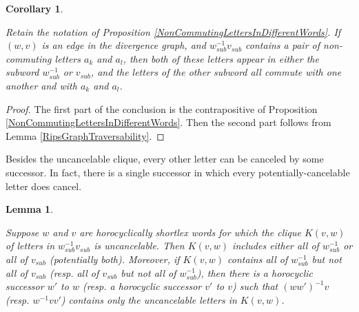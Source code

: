 \documentclass{amsart}
\newtheorem{lemma}[theorem]{Lemma}
\newtheorem{corollary}[theorem]{Corollary}
\theoremstyle{definition}
\theoremstyle{remark}
\begin{document}
	\begin{corollary} \label{NonCommutingLettersCor}
		
		Retain the notation of Proposition \ref{NonCommutingLettersInDifferentWords}. If $(w,v)$ is an edge in the divergence graph, and $w_{sub}^{-1}v_{sub}$ contains a pair of non-commuting letters $a_k$ and $a_l$, then both of these letters appear in either the subword $w_{sub}^{-1}$ or $v_{sub}$, and the letters of the other subword all commute with one another and with $a_k$ and $a_l$.
		
	\end{corollary}
	
	\begin{proof}
		The first part of the conclusion is the contrapositive of Proposition \ref{NonCommutingLettersInDifferentWords}. Then the second part follows from Lemma \ref{RipsGraphTraversability}.
	\end{proof}
	
	Besides the uncancelable clique, every other letter can be canceled by some successor. In fact, there is a single successor in which every potentially-cancelable letter does cancel.
	
	\begin{lemma} \label{MaximalCancellation}
		
		Suppose $w$ and $v$ are horocyclically shortlex words for which the clique $K(v,w)$ of letters in $w_{sub}^{-1}v_{sub}$ is uncancelable. Then $K(v,w)$ includes either all of $w_{sub}^{-1}$ or all of $v_{sub}$ (potentially both). Moreover, if $K(v,w)$ contains all of $w_{sub}^{-1}$ but not all of $v_{sub}$ (resp. all of $v_{sub}$ but not all of $w_{sub}^{-1}$), then there is a horocyclic successor $w'$ to $w$ (resp. a horocyclic successor $v'$ to $v$) such that $(ww')^{-1}v$ (resp. $w^{-1}vv'$) contains only the uncancelable letters in $K(v,w)$.
		
	\end{lemma}
	
\end{document}
